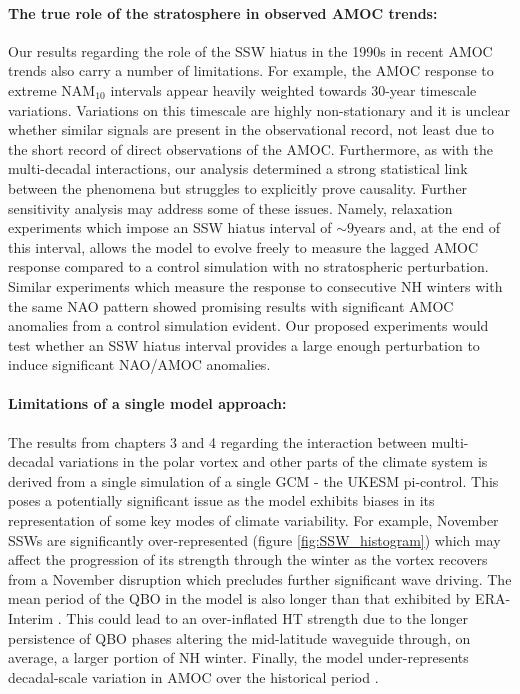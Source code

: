 \paragraph{The true role of the stratosphere in observed AMOC trends:}
Our results regarding the role of the SSW hiatus in the 1990s in recent AMOC trends also carry a number of limitations. For example, the AMOC response to extreme NAM$_{10}$ intervals appear heavily weighted towards 30-year timescale variations. Variations on this timescale are highly non-stationary and it is unclear whether similar signals are present in the observational record, not least due to the short record of direct observations of the AMOC. Furthermore, as with the multi-decadal interactions, our analysis determined a strong statistical link between the phenomena but struggles to explicitly prove causality. Further sensitivity analysis may address some of these issues. Namely, relaxation experiments which impose an SSW hiatus interval of $\sim9$years and, at the end of this interval, allows the model to evolve freely to measure the lagged AMOC response compared to a control simulation with no stratospheric perturbation. Similar experiments which measure the response to consecutive NH winters with the same NAO pattern \citep{delworthImpact2016c} showed promising results with significant AMOC anomalies from a control simulation evident. Our proposed experiments would test whether an SSW hiatus interval provides a large enough perturbation to induce significant NAO/AMOC anomalies.

\paragraph{Limitations of a single model approach:}
The results from chapters 3 and 4 regarding the interaction between multi-decadal variations in the polar vortex and other parts of the climate system is derived from a single simulation of a single GCM - the UKESM pi-control. This poses a potentially significant issue as the model exhibits biases in its representation of some key modes of climate variability. For example, November SSWs are significantly over-represented (figure \ref{fig:SSW_histogram}) which may affect the progression of its strength through the winter as the vortex recovers from a November disruption which precludes further significant wave driving. The mean period of the QBO in the model is also longer than that exhibited by ERA-Interim \citep{bushellEvaluation2020b}. This could lead to an over-inflated HT strength due to the longer persistence of QBO phases altering the mid-latitude waveguide through, on average, a larger portion of NH winter. Finally, the model under-represents decadal-scale variation in AMOC over the historical period \citep{robsonEvaluation2020d}. 

